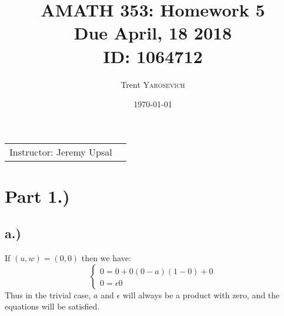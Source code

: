 \documentclass{article}
\title{AMATH 353: Homework 5 \\Due April, 18 2018 \\ ID: 1064712} %
\author{Trent \textsc{Yarosevich}} %
\date{\today} %
\begin{document}
\maketitle %
\setlength\parindent{1cm}

\begin{center}
\begin{tabular}{l r}
Instructor: Jeremy Upsal %
\end{tabular}
\end{center}


\section*{Part 1.)} 
\subsection*{a.)}
If $(u,w) = (0, 0)$ then we have:
\[
  \begin{cases}
               0 = 0 + 0(0 - a)(1-0) + 0\\
               0 = \epsilon 0
            \end{cases}
\]
Thus in the trivial case, $a$ and $\epsilon$ will always be a product with zero, and the equations will be satisfied.
\end{document}
